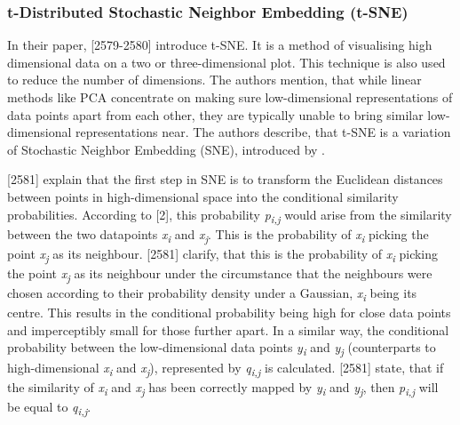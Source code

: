 \subsubsection{t-Distributed Stochastic Neighbor Embedding (t-SNE)}
\label{section:tSNE}
In their paper, \textcite{maaten2008visualizing}[2579-2580] introduce t-SNE. It is a method of visualising high dimensional data on a two or three-dimensional plot. This technique is also used to reduce the number of dimensions. The authors mention, that while linear methods like PCA concentrate on making sure low-dimensional representations of data points apart from each other, they are typically unable to bring similar low-dimensional representations near.
The authors describe, that t-SNE is a variation of Stochastic Neighbor Embedding (SNE), introduced by \textcite{hinton2003stochastic}. 





\textcite{maaten2008visualizing}[2581] explain that the first step in SNE is to transform the Euclidean distances between points in high-dimensional space into the conditional similarity probabilities. According to \textcite{hinton2003stochastic}[2], this probability \textit{p\textsubscript{i,j}} would arise from the similarity between the two datapoints \textit{x\textsubscript{i}} and \textit{x\textsubscript{j}}. This is the probability of \textit{x\textsubscript{i}} picking the point \textit{x\textsubscript{j}} as its neighbour. \textcite{maaten2008visualizing}[2581] clarify, that this is the probability of \textit{x\textsubscript{i}} picking the point \textit{x\textsubscript{j}} as its neighbour under the circumstance that the neighbours were chosen according to their probability density under a Gaussian, \textit{x\textsubscript{i}} being its centre. This results in the conditional probability being high for close data points and imperceptibly small for those further apart.
In a similar way, the conditional probability between the low-dimensional data points \textit{y\textsubscript{i}} and \textit{y\textsubscript{j}} (counterparts to high-dimensional \textit{x\textsubscript{i}} and \textit{x\textsubscript{j}}), represented by \textit{q\textsubscript{i,j}} is calculated. 
\textcite{maaten2008visualizing}[2581] state, that if the similarity of \textit{x\textsubscript{i}} and \textit{x\textsubscript{j}} has been correctly mapped by \textit{y\textsubscript{i}} and \textit{y\textsubscript{j}}, then \textit{p\textsubscript{i,j}} will be equal to \textit{q\textsubscript{i,j}}. 


